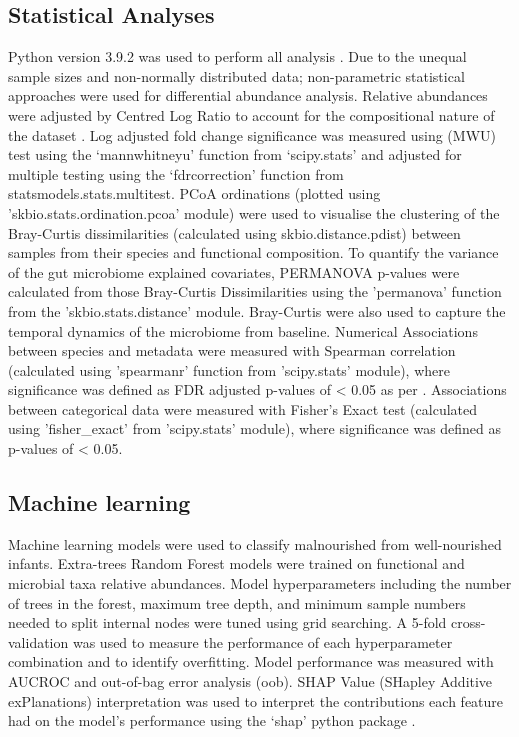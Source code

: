 \documentclass{article}
\begin{document}
\subsection*{Statistical Analyses}
Python version 3.9.2 was used to perform all analysis \cite{van1995python}.
Due to the unequal sample sizes and non-normally distributed data; non-parametric statistical approaches were used for differential abundance analysis.
Relative abundances were adjusted by Centred Log Ratio to account for the compositional nature of the dataset \cite{gloor2016s}.
Log adjusted fold change significance was measured using (\gls{MWU}) test using the ‘mannwhitneyu’ function from ‘scipy.stats’ and adjusted for multiple testing using the ‘fdrcorrection’ function from statsmodels.stats.multitest.
\gls{PCoA} ordinations (plotted using 'skbio.stats.ordination.pcoa' module) were used to visualise the clustering of the Bray-Curtis dissimilarities (calculated using skbio.distance.pdist) between samples from their species and functional composition.
To quantify the variance of the gut microbiome explained covariates, \gls{PERMANOVA} p-values were calculated from those Bray-Curtis Dissimilarities using the ’permanova’ function from the 'skbio.stats.distance' module.
Bray-Curtis were also used to capture the temporal dynamics of the microbiome from baseline.
Numerical Associations between species and metadata were measured with Spearman correlation (calculated using 'spearmanr' function from 'scipy.stats' module), where significance was defined as \gls{FDR} adjusted p-values of \textless{} 0.05 as per \citet{2020SciPyNMeth}.
Associations between categorical data were measured with Fisher's Exact test (calculated using 'fisher\_exact' from 'scipy.stats' module), where significance was defined as p-values of \textless{} 0.05.

\subsection*{Machine learning}
Machine learning models were used to classify malnourished from well-nourished infants.
Extra-trees Random Forest models were trained on functional and microbial taxa relative abundances.
Model hyperparameters including the number of trees in the forest, maximum tree depth, and minimum sample numbers needed to split internal nodes were tuned using grid searching.
A 5-fold cross-validation was used to measure the performance of each hyperparameter combination and to identify overfitting.
Model performance was measured with AUCROC and out-of-bag error analysis (oob).
SHAP Value (SHapley Additive exPlanations) interpretation was used to interpret the contributions each feature had on the model's performance using the ‘shap’ python package \cite{lundberg2017unified}.
\end{document}
